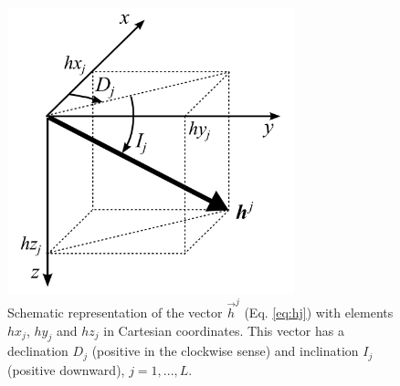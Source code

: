 \documentclass[journal abbreviation, npg]{copernicus}
\begin{document}
\begin{figure}[t]
\vspace*{2mm}
\begin{center}
\includegraphics[width=8.3cm]{Figures/Fig2.png}
\end{center}
\caption{Schematic representation of the vector $\vec{h}^{j}$ (Eq. \ref{eq:hj}) with elements $hx_{j}$, $hy_{j}$ and $hz_{j}$ in Cartesian coordinates. This vector has a declination $D_{j}$ (positive in the clockwise sense) and inclination $I_{j}$ (positive downward), $j = 1, ..., L$.}
\label{fig:spherical-coordinates}
\end{figure}
\end{document}
